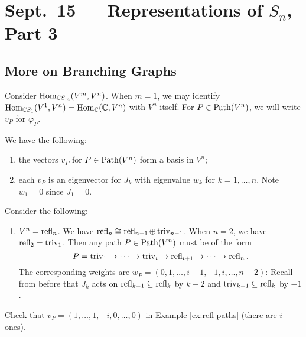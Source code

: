 \chapter{Sept.~15 --- Representations of \texorpdfstring{$S_n$}{Sn}, Part 3}

\section{More on Branching Graphs}
\begin{remark}
  Consider $\operatorname{Hom}_{\mathbb{C} S_m}(V^m, V^n)$.
  When $m = 1$, we may identify
  $\operatorname{Hom}_{\mathbb{C} S_1}(V^1, V^n) = \operatorname{Hom}_{\mathbb{C}}(\mathbb{C}, V^n)$
  with $V^n$ itself. For
  $P \in \operatorname{Path}(V^n)$, we will write
  $v_P$ for $\varphi_P$.
\end{remark}

\begin{corollary}
  We have the following:
  \begin{enumerate}
    \item the vectors $v_P$ for
      $P \in \operatorname{Path}(V^n)$ form a basis
      in $V^n$;
    \item each $v_P$ is an eigenvector
      for $J_k$ with eigenvalue
      $w_k$ for $k = 1, \ldots, n$. Note $w_1 = 0$ since $J_1 = 0$.
  \end{enumerate}
\end{corollary}

\begin{example}\label{ex:refl-paths}
  Consider the following:
  \begin{enumerate}
    \item $V^n = \operatorname{refl}_n$. We have
      $\operatorname{refl}_n \cong \operatorname{refl}_{n - 1} \oplus \operatorname{triv}_{n - 1}$.
      When $n = 2$, we have
      $\operatorname{refl}_2 = \operatorname{triv}_1$. Then any path
      $P \in \operatorname{Path}(V^n)$ must be of the form
      \[
        P = \operatorname{triv}_1 \to \dots \to \operatorname{triv}_i \to \operatorname{refl}_{i + 1} \to \dots \to \operatorname{refl}_n.
      \]
      The corresponding weights are
      $w_P = (0, 1, \dots, i - 1, -1, i, \dots, n - 2)$:
      Recall from before that $J_k$ acts on $\operatorname{refl}_{k - 1} \subseteq \operatorname{refl}_k$
      by $k - 2$ and
      $\operatorname{triv}_{k - 1} \subseteq \operatorname{refl}_k$ by
      $-1$.
  \end{enumerate}
\end{example}

\begin{exercise}
  Check that
  $v_P = (1, \dots, 1, -i, 0, \dots, 0)$
  in Example \ref{ex:refl-paths} (there are
  $i$ ones).
\end{exercise}

